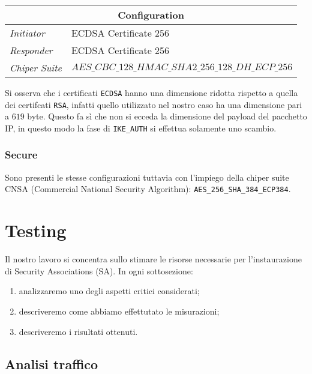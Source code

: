 \documentclass[
10pt, %
a4paper, %
oneside, %
headinclude,footinclude, %
BCOR5mm, %
]{scrartcl}
\begin{document}
\begin{center}
    \setlength{\arrayrulewidth}{0.4mm}
    \renewcommand{\arraystretch}{1.3}
    \begin{tabular}{|l|l|}
        \hline
        \multicolumn{2}{|c|}{\textbf{Configuration}} \\
        \hline
        \textit{Initiator} & ECDSA Certificate 256\\
        \textit{Responder} & ECDSA Certificate 256 \\
        \textit{Chiper Suite} & $AES\_CBC\_128\_HMAC\_SHA2\_256\_128\_DH\_ECP\_256$ \\
        \hline
    \end{tabular}
\end{center}
\vspace*{0.2cm}
\noindent
Si osserva che i certificati \lstinline|ECDSA| hanno una dimensione ridotta rispetto a quella dei certifcati \lstinline|RSA|, infatti quello utilizzato nel
nostro caso ha una dimensione pari a $619$ byte. Questo fa sì che non si ecceda la dimensione del payload del pacchetto IP, in questo
modo la fase di \lstinline|IKE_AUTH| si effettua solamente uno scambio.


\subsubsection*{Secure}
Sono presenti le stesse configurazioni tuttavia con l'impiego della chiper suite CNSA (Commercial National Security Algorithm):
\lstinline|AES_256_SHA_384_ECP384|.
\newpage
\section{Testing}

Il nostro lavoro si concentra sullo stimare le risorse necessarie per l'instaurazione di Security Associations (SA). In ogni sottosezione:
\begin{enumerate}
    \item analizzaremo uno degli aspetti critici considerati;
    \item descriveremo come abbiamo effettutato le misurazioni;
    \item descriveremo i risultati ottenuti.
\end{enumerate}


\subsection{Analisi traffico}
\end{document}
